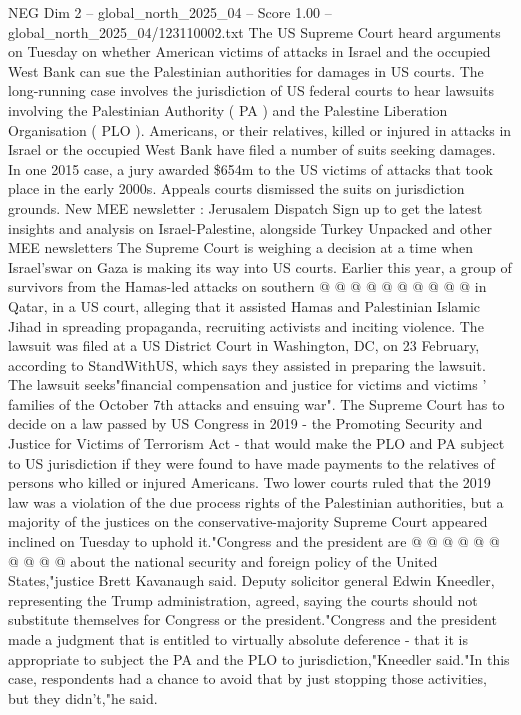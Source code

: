 \begin{textsample}{NEG Dim 2 – global\_north\_2025\_04 – Score 1.00 – global\_north\_2025\_04/123110002.txt}  \label{ex:f2_neg_021}
The US Supreme Court heard arguments on Tuesday on whether American victims of attacks in Israel and the occupied West Bank can sue the Palestinian authorities for damages in US courts.
The long-running case involves the jurisdiction of US federal courts to hear lawsuits involving the Palestinian Authority ( PA ) and the Palestine Liberation Organisation ( PLO ).
Americans, or their relatives, killed or injured in attacks in Israel or the occupied West Bank have filed a number of suits seeking damages.
In one 2015 case, a jury awarded \$654m to the US victims of attacks that took place in the early 2000s.
Appeals courts dismissed the suits on jurisdiction grounds.
New MEE newsletter : Jerusalem Dispatch Sign up to get the latest insights and analysis on Israel-Palestine, alongside Turkey Unpacked and other MEE newsletters The Supreme Court is weighing a decision at a time when Israel'swar on Gaza is making its way into US courts.
Earlier this year, a group of survivors from the Hamas-led attacks on southern @ @ @ @ @ @ @ @ @ @ in Qatar, in a US court, alleging that it assisted Hamas and Palestinian Islamic Jihad in spreading propaganda, recruiting activists and inciting violence.
The lawsuit was filed at a US District Court in Washington, DC, on 23 February, according to StandWithUS, which says they assisted in preparing the lawsuit.
The lawsuit seeks"financial compensation and justice for victims and victims ' families of the October 7th attacks and ensuing war".
The Supreme Court has to decide on a law passed by US Congress in 2019 - the Promoting Security and Justice for Victims of Terrorism Act - that would make the PLO and PA subject to US jurisdiction if they were found to have made payments to the relatives of persons who killed or injured Americans.
Two lower courts ruled that the 2019 law was a violation of the due process rights of the Palestinian authorities, but a majority of the justices on the conservative-majority Supreme Court appeared inclined on Tuesday to uphold it."Congress and the president are @ @ @ @ @ @ @ @ @ @ about the national security and foreign policy of the United States,"justice Brett Kavanaugh said.
Deputy solicitor general Edwin Kneedler, representing the Trump administration, agreed, saying the courts should not substitute themselves for Congress or the president."Congress and the president made a judgment that is entitled to virtually absolute deference - that it is appropriate to subject the PA and the PLO to jurisdiction,"Kneedler said."In this case, respondents had a chance to avoid that by just stopping those activities, but they didn't,"he said.

\end{textsample}
